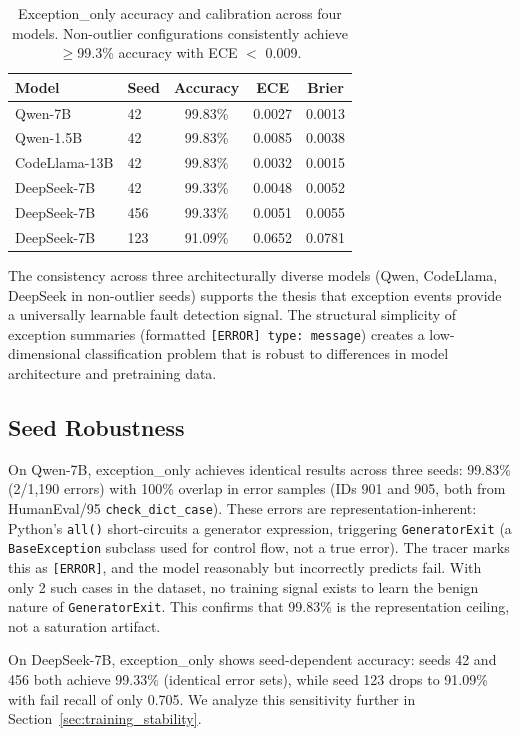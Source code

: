 \documentclass[11pt]{article}
\begin{document}
\begin{table}[t]
\centering
\caption{Exception\_only accuracy and calibration across four models. Non-outlier configurations consistently achieve $\geq$99.3\% accuracy with ECE $<$ 0.009.}
\label{tab:fourmodel_cal}
\begin{tabular}{llccc}
\toprule
Model & Seed & Accuracy & ECE & Brier \\
\midrule
Qwen-7B & 42 & 99.83\% & 0.0027 & 0.0013 \\
Qwen-1.5B & 42 & 99.83\% & 0.0085 & 0.0038 \\
CodeLlama-13B & 42 & 99.83\% & 0.0032 & 0.0015 \\
DeepSeek-7B & 42 & 99.33\% & 0.0048 & 0.0052 \\
DeepSeek-7B & 456 & 99.33\% & 0.0051 & 0.0055 \\
DeepSeek-7B & 123 & 91.09\% & 0.0652 & 0.0781 \\
\bottomrule
\end{tabular}
\end{table}

The consistency across three architecturally diverse models (Qwen, CodeLlama, DeepSeek in non-outlier seeds) supports the thesis that exception events provide a universally learnable fault detection signal. The structural simplicity of exception summaries (formatted \texttt{[ERROR] type: message}) creates a low-dimensional classification problem that is robust to differences in model architecture and pretraining data.

\subsection{Seed Robustness}
\label{sec:seed}

On Qwen-7B, exception\_only achieves identical results across three seeds: 99.83\% (2/1,190 errors) with 100\% overlap in error samples (IDs 901 and 905, both from HumanEval/95 \texttt{check\_dict\_case}). These errors are representation-inherent: Python's \texttt{all()} short-circuits a generator expression, triggering \texttt{GeneratorExit} (a \texttt{BaseException} subclass used for control flow, not a true error). The tracer marks this as \texttt{[ERROR]}, and the model reasonably but incorrectly predicts fail. With only 2 such cases in the dataset, no training signal exists to learn the benign nature of \texttt{GeneratorExit}. This confirms that 99.83\% is the representation ceiling, not a saturation artifact.

On DeepSeek-7B, exception\_only shows seed-dependent accuracy: seeds 42 and 456 both achieve 99.33\% (identical error sets), while seed 123 drops to 91.09\% with fail recall of only 0.705. We analyze this sensitivity further in Section~\ref{sec:training_stability}.
\end{document}

